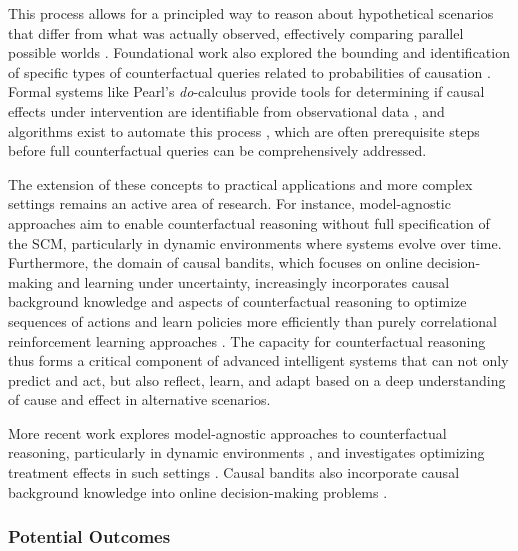 {This process allows for a principled way to reason about hypothetical scenarios that differ from what was actually observed, effectively comparing parallel possible worlds \cite{Pearl2009Causality, Morgan2015Counterfactuals}. Foundational work also explored the bounding and identification of specific types of counterfactual queries related to probabilities of causation \cite{tian2000probabilities}. Formal systems like Pearl's \textit{do}-calculus provide tools for determining if causal effects under intervention are identifiable from observational data \cite{tian2002identification}, and algorithms exist to automate this process \cite{shpitser2012efficient}, which are often prerequisite steps before full counterfactual queries can be comprehensively addressed.

The extension of these concepts to practical applications and more complex settings remains an active area of research. For instance, model-agnostic approaches aim to enable counterfactual reasoning without full specification of the SCM, particularly in dynamic environments where systems evolve over time. Furthermore, the domain of causal bandits, which focuses on online decision-making and learning under uncertainty, increasingly incorporates causal background knowledge and aspects of counterfactual reasoning to optimize sequences of actions and learn policies more efficiently than purely correlational reinforcement learning approaches \cite{Lattimore2016Causal, Lee2018Structural, Zhang2022Causal, Bilodeau2022Adaptively}. The capacity for counterfactual reasoning thus forms a critical component of advanced intelligent systems that can not only predict and act, but also reflect, learn, and adapt based on a deep understanding of cause and effect in alternative scenarios.

More recent work explores model-agnostic approaches to counterfactual reasoning, particularly in dynamic environments \cite{Berrevoets2021ModelAgnostic}, and investigates optimizing treatment effects in such settings \cite{Berrevoets2022Treatment}. Causal bandits also incorporate causal background knowledge into online decision-making problems \cite{Lattimore2016Causal, Lee2018Structural, Zhang2022Causal, Bilodeau2022Adaptively}.


\subsubsection{Potential Outcomes}
\label{subsec:potential_outcomes}

}
